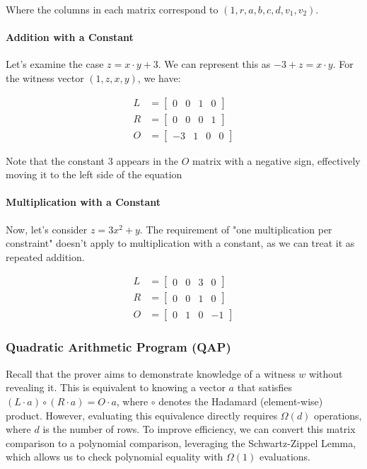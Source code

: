 \documentclass{article}
\begin{document}
Where the columns in each matrix correspond to $(1, r, a, b, c, d, v_1, v_2)$.

\paragraph{Addition with a Constant}

Let's examine the case $z = x \cdot y + 3$. We can represent this as $-3 + z = x \cdot y$. For the witness vector $(1, z, x, y)$, we have:

\begin{align*}
L &= \begin{bmatrix}
0 & 0 & 1 & 0
\end{bmatrix} \\
R &= \begin{bmatrix}
0 & 0 & 0 & 1
\end{bmatrix} \\
O &= \begin{bmatrix}
-3 & 1 & 0 & 0
\end{bmatrix}
\end{align*}

Note that the constant 3 appears in the $O$ matrix with a negative sign, effectively moving it to the left side of the equation

\paragraph{Multiplication with a Constant}

Now, let's consider $z = 3x^2 + y$. The requirement of "one multiplication per constraint" doesn't apply to multiplication with a constant, as we can treat it as repeated addition.

\begin{align*}
L &= \begin{bmatrix}
0 & 0 & 3 & 0
\end{bmatrix} \\
R &= \begin{bmatrix}
0 & 0 & 1 & 0
\end{bmatrix} \\
O &= \begin{bmatrix}
0 & 1 & 0 & -1
\end{bmatrix}
\end{align*}

\subsubsection{Quadratic Arithmetic Program (QAP)}
Recall that the prover aims to demonstrate knowledge of a witness $w$ without revealing it. This is equivalent to knowing a vector $a$ that satisfies $(L \cdot a) \circ (R \cdot a) = O \cdot a$, where $\circ$ denotes the Hadamard (element-wise) product. However, evaluating this equivalence directly requires $\Omega(d)$ operations, where $d$ is the number of rows. To improve efficiency, we can convert this matrix comparison to a polynomial comparison, leveraging the Schwartz-Zippel Lemma, which allows us to check polynomial equality with $\Omega(1)$ evaluations.
\end{document}
